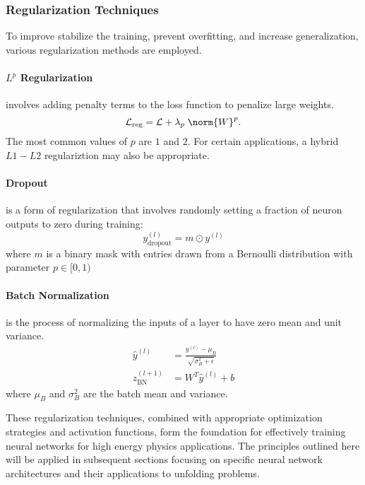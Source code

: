         \subsubsection{Regularization Techniques}
            To improve stabilize the training, prevent overfitting, and increase generalization, various regularization methods are employed.

            \paragraph{\(L^p\) Regularization} involves adding penalty terms to the loss function to penalize large weights.
                \begin{equation}
                    \mathcal{L}_{\textrm{reg}} = \mathcal{L} + \lambda_p\;\norm{W}^p.
                \end{equation}
                The most common values of $p$ are $1$ and $2.$
                For certain applications, a hybrid $L1-L2$ regulariztion may also be appropriate.
            \paragraph{Dropout}is a form of regularization that involves randomly setting a fraction of neuron outputs to zero during training:
               \begin{equation}
                    y^{(l)}_{\text{dropout}} = m \odot y^{(l)}
               \end{equation}
               where \(m\) is a binary mask with entries drawn from a Bernoulli distribution with parameter $p\in [0, 1)$

            \paragraph{Batch Normalization} is the process of normalizing the inputs of a layer to have zero mean and unit variance.
                   \begin{align}
                   \hat{y}^{(l)} &= \frac{y^{(l)} - \mu_B}{\sqrt{\sigma_B^2 + \epsilon}} \\
                   z_{\text{BN}}^{(l+1)} &= W^T \hat{y}^{(l)} + b
                   \end{align}
                   where \(\mu_B\) and \(\sigma_B^2\) are the batch mean and variance.


        These regularization techniques, combined with appropriate optimization strategies and activation functions, form the foundation for effectively training neural networks for high energy physics applications.
        The principles outlined here will be applied in subsequent sections focusing on specific neural network architectures and their applications to unfolding problems.
